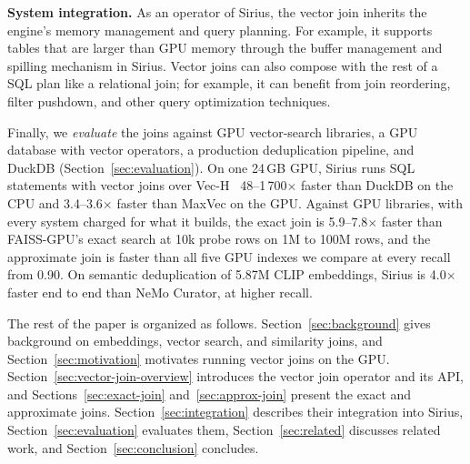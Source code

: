 \noindent\textbf{System integration.}
As an operator of Sirius, the vector join inherits the engine's memory management and query planning.
For example, it supports tables that are larger than GPU memory through the buffer management and spilling mechanism in Sirius.
Vector joins can also compose with the rest of a SQL plan like a relational join; for example, it can benefit from join reordering, filter pushdown, and other query optimization techniques.

Finally, we \emph{evaluate} the joins against GPU vector-search libraries, a GPU database with vector operators, a production deduplication pipeline, and DuckDB (Section~\ref{sec:evaluation}).
On one 24\,GB GPU, Sirius runs SQL statements with vector joins over Vec-H~\cite{MaxVec26} 48--1\,700$\times$ faster than DuckDB on the CPU and 3.4--3.6$\times$ faster than MaxVec on the GPU.
Against GPU libraries, with every system charged for what it builds, the exact join is 5.9--7.8$\times$ faster than FAISS-GPU's exact search at 10k probe rows on 1M to 100M rows, and the approximate join is faster than all five GPU indexes we compare at every recall from 0.90.
On semantic deduplication of 5.87M CLIP embeddings, Sirius is 4.0$\times$ faster end to end than NeMo Curator, at higher recall.

The rest of the paper is organized as follows.
Section~\ref{sec:background} gives background on embeddings, vector search, and similarity joins, and Section~\ref{sec:motivation} motivates running vector joins on the GPU.
Section~\ref{sec:vector-join-overview} introduces the vector join operator and its API, and Sections~\ref{sec:exact-join} and~\ref{sec:approx-join} present the exact and approximate joins.
Section~\ref{sec:integration} describes their integration into Sirius, Section~\ref{sec:evaluation} evaluates them, Section~\ref{sec:related} discusses related work, and Section~\ref{sec:conclusion} concludes.
